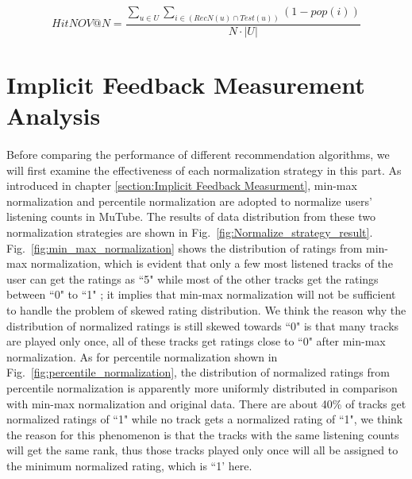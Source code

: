 \documentclass[a4paper,12pt]{report}
\begin{document}
\begin{equation}
    HitNOV@N = \frac{\sum_{u\in U}\sum_{i\in (RecN(u)\cap Test(u))}(1-pop(i))}{N\cdot |U|}
    \label{eq:hitnov}
\end{equation}

\section{Implicit Feedback Measurement Analysis}

\paragraph{}
Before comparing the performance of different recommendation algorithms, we will first examine the effectiveness of each normalization strategy in this part. As introduced in chapter \ref{section:Implicit Feedback Measurment}, min-max normalization and percentile normalization are adopted to normalize users' listening counts in MuTube. The results of data distribution from these two normalization strategies are shown in Fig.~\ref{fig:Normalize_strategy_result}. Fig.~\ref{fig:min_max_normalization} shows the distribution of ratings from min-max normalization, which is evident that only a few most listened tracks of the user can get the ratings as ``5" while most of the other tracks get the ratings between ``0" to ``1" ; it implies that min-max normalization will not be sufficient to handle the problem of skewed rating distribution. We think the reason why the distribution of normalized ratings is still skewed towards ``0" is that many tracks are played only once, all of these tracks get ratings close to ``0" after min-max normalization. As for percentile normalization shown in Fig.~\ref{fig:percentile_normalization}, the distribution of normalized ratings from percentile normalization is apparently more uniformly distributed in comparison with min-max normalization and original data. There are about 40\% of tracks get normalized ratings of ``1" while no track gets a normalized rating of ``1", we think the reason for this phenomenon is that the tracks with the same listening counts will get the same rank, thus those tracks played only once will all be assigned to the minimum normalized rating, which is ``1' here.
\end{document}
